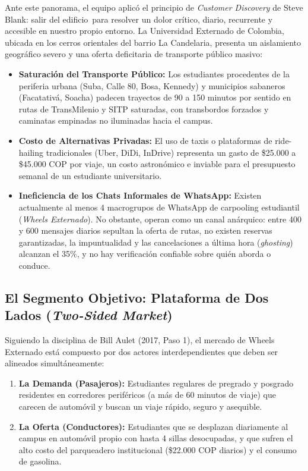 \documentclass[11pt,a4paper]{article}
\begin{document}
Ante este panorama, el equipo aplic\'o el principio de \textit{Customer Discovery} de Steve Blank: \guillemotleft salir del edificio\guillemotright\ para resolver un dolor cr\'itico, diario, recurrente y accesible en nuestro propio entorno. La Universidad Externado de Colombia, ubicada en los cerros orientales del barrio La Candelaria, presenta un aislamiento geogr\'afico severo y una oferta deficitaria de transporte p\'ublico masivo:
\begin{itemize}[leftmargin=*]
    \item \textbf{Saturaci\'on del Transporte P\'ublico:} Los estudiantes procedentes de la periferia urbana (Suba, Calle 80, Bosa, Kennedy) y municipios sabaneros (Facatativ\'a, Soacha) padecen trayectos de 90 a 150 minutos por sentido en rutas de TransMilenio y SITP saturadas, con transbordos forzados y caminatas empinadas no iluminadas hacia el campus.
    \item \textbf{Costo de Alternativas Privadas:} El uso de taxis o plataformas de ride-hailing tradicionales (Uber, DiDi, InDrive) representa un gasto de \$25.000 a \$45.000 COP por viaje, un costo astron\'omico e inviable para el presupuesto semanal de un estudiante universitario.
    \item \textbf{Ineficiencia de los Chats Informales de WhatsApp:} Existen actualmente al menos 4 macrogrupos de WhatsApp de carpooling estudiantil (\textit{Wheels Externado}). No obstante, operan como un canal an\'arquico: entre 400 y 600 mensajes diarios sepultan la oferta de rutas, no existen reservas garantizadas, la impuntualidad y las cancelaciones a \'ultima hora (\textit{ghosting}) alcanzan el 35\%, y no hay verificaci\'on confiable sobre qui\'en aborda o conduce.
\end{itemize}

\subsection{El Segmento Objetivo: Plataforma de Dos Lados (\textit{Two-Sided Market})}
Siguiendo la disciplina de Bill Aulet (2017, Paso 1), el mercado de Wheels Externado est\'a compuesto por dos actores interdependientes que deben ser alineados simult\'aneamente:
\begin{enumerate}[leftmargin=*]
    \item \textbf{La Demanda (Pasajeros):} Estudiantes regulares de pregrado y posgrado residentes en corredores perif\'ericos (a m\'as de 60 minutos de viaje) que carecen de autom\'ovil y buscan un viaje r\'apido, seguro y asequible.
    \item \textbf{La Oferta (Conductores):} Estudiantes que se desplazan diariamente al campus en autom\'ovil propio con hasta 4 sillas desocupadas, y que sufren el alto costo del parqueadero institucional (\$22.000 COP diarios) y el consumo de gasolina.
\end{enumerate}
\end{document}
